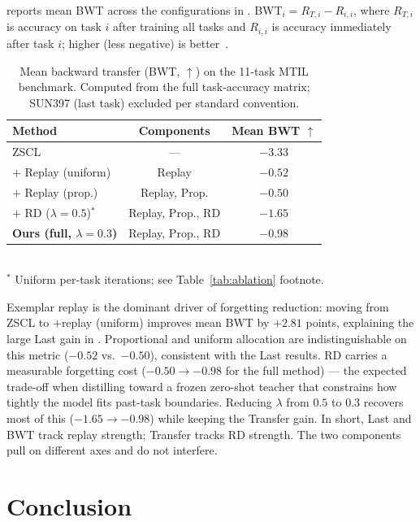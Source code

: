 \documentclass{article}
\begin{document}
   reports mean BWT across the configurations in
  . BWT$_i = R_{T,i} - R_{i,i}$, where $R_{T,i}$ is accuracy
  on task $i$ after training all tasks and $R_{i,i}$ is accuracy immediately after
  task $i$; higher (less negative) is better~\citep{lopezpaz2017gem}.

  \begin{table}[h]
  \centering
  \caption{Mean backward transfer (BWT, $\uparrow$) on the 11-task MTIL benchmark.
  Computed from the full task-accuracy matrix; SUN397 (last task) excluded per
  standard convention.}
  \label{tab:bwt}
  \begin{tabular}{lcc}
  \toprule
  Method & Components & Mean BWT $\uparrow$ \\
  \midrule
  ZSCL~\citep{zheng2023zscl}            & ---                   & $-3.33$ \\
  {$+$ Replay (uniform)}                & Replay                & $-0.52$ \\
  {$+$ Replay (prop.)}                  & Replay, Prop.         & $-0.50$ \\
  {$+$ RD ($\lambda{=}0.5$)}$^\ast$     & Replay, Prop., RD     & $-1.65$ \\
  \textbf{Ours (full, $\lambda{=}0.3$)} & Replay, Prop., RD     & $-0.98$ \\
  \bottomrule
  \end{tabular}
  \\[2pt]
  {\small $^\ast$ Uniform per-task iterations; see Table~\ref{tab:ablation} footnote.}
  \end{table}

  Exemplar replay is the dominant driver of forgetting reduction: moving from ZSCL
  to $+$replay (uniform) improves mean BWT by $+2.81$ points, explaining the large
  Last gain in . Proportional and uniform allocation are
  indistinguishable on this metric ($-0.52$ vs.\ $-0.50$), consistent with the Last
  results. RD carries a measurable forgetting cost ($-0.50 \to -0.98$ for the full
  method) — the expected trade-off when distilling toward a frozen zero-shot teacher
  that constrains how tightly the model fits past-task boundaries. Reducing $\lambda$
  from $0.5$ to $0.3$ recovers most of this ($-1.65 \to -0.98$) while keeping the
  Transfer gain. In short, Last and BWT track replay strength; Transfer tracks RD
  strength. The two components pull on different axes and do not interfere.

  \section{Conclusion}
\end{document}
